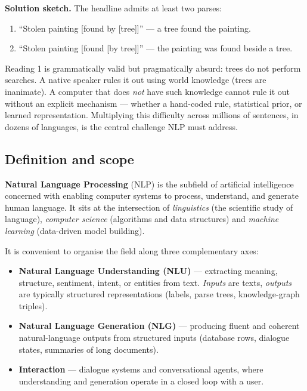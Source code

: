 \textbf{Solution sketch.} The headline admits at least two parses:
\begin{enumerate}
    \item ``Stolen painting [found by [tree]]'' --- a tree found the painting.
    \item ``Stolen painting [found [by tree]]'' --- the painting was found beside a tree.
\end{enumerate}
Reading 1 is grammatically valid but pragmatically absurd: trees do not perform searches. A native speaker rules it out using world knowledge (trees are inanimate). A computer that does \emph{not} have such knowledge cannot rule it out without an explicit mechanism --- whether a hand-coded rule, statistical prior, or learned representation. Multiplying this difficulty across millions of sentences, in dozens of languages, is the central challenge NLP must address.

\subsection{Definition and scope}

\begin{definition}
\textbf{Natural Language Processing} (NLP) is the subfield of artificial intelligence concerned with enabling computer systems to process, understand, and generate human language. It sits at the intersection of \emph{linguistics} (the scientific study of language), \emph{computer science} (algorithms and data structures) and \emph{machine learning} (data-driven model building).
\end{definition}

It is convenient to organise the field along three complementary axes:

\begin{itemize}
    \item \textbf{Natural Language Understanding (NLU)} --- extracting meaning, structure, sentiment, intent, or entities from text. \emph{Inputs} are texts, \emph{outputs} are typically structured representations (labels, parse trees, knowledge-graph triples).
    \item \textbf{Natural Language Generation (NLG)} --- producing fluent and coherent natural-language outputs from structured inputs (database rows, dialogue states, summaries of long documents).
    \item \textbf{Interaction} --- dialogue systems and conversational agents, where understanding and generation operate in a closed loop with a user.
\end{itemize}

